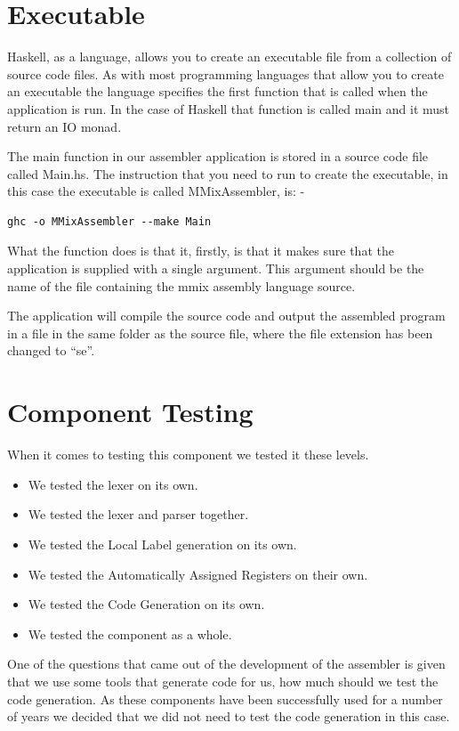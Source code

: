 \documentclass[a4paper,11pt]{report}
\begin{document}
\section{Executable}
Haskell, as a language, allows you to create an executable file from a collection of source code files. As with most programming languages that allow you to create an executable the language specifies the first function that is called when the application is run. In the case of Haskell that function is called main and it must return an IO monad.

The main function in our assembler application is stored in a source code file called Main.hs. The instruction that you need to run to create the executable, in this case the executable is called MMixAssembler, is: -

\begin{lstlisting}
ghc -o MMixAssembler --make Main
\end{lstlisting}

What the function does is that it, firstly, is that it makes sure that the application is supplied with a single argument. This argument should be the name of the file containing the mmix assembly language source.

The application will compile the source code and output the assembled program in a file in the same folder as the source file, where the file extension has been changed to ``se''.
\section{Component Testing}
When it comes to testing this component we tested it these levels.
\begin{itemize}
\item We tested the lexer on its own.
\item We tested the lexer and parser together.
\item We tested the Local Label generation on its own.
\item We tested the Automatically Assigned Registers on their own.
\item We tested the Code Generation on its own.
\item We tested the component as a whole.
\end{itemize}

One of the questions that came out of the development of the assembler is given that we use some tools that generate code for us, how much should we test the code generation. As these components have been successfully used for a number of years we decided that we did not need to test the code generation in this case.
\end{document}
